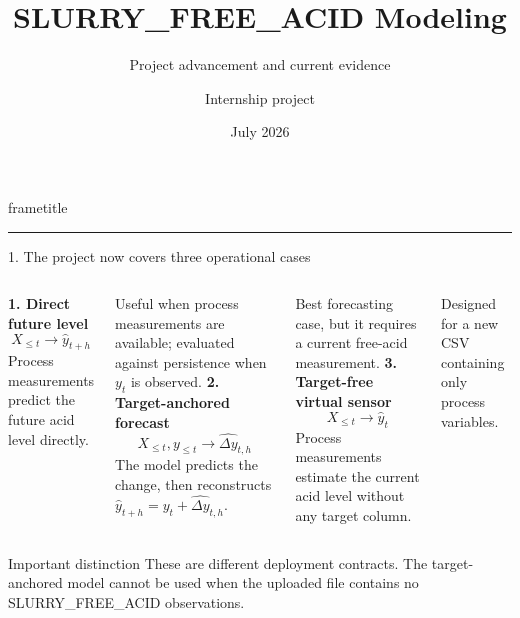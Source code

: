 \documentclass[10pt,aspectratio=169]{beamer}
\title{SLURRY\_FREE\_ACID Modeling}
\subtitle{Project advancement and current evidence}
\author{Internship project}
\date{July 2026}
\newcommand{\smallnote}[1]{{\scriptsize\color{Gray}#1}}
\begin{document}
\begin{frame}[plain]
  \begin{beamercolorbox}[wd=\paperwidth,ht=\paperheight,dp=0pt]{frametitle}
    \vspace{2.2cm}\hspace{1.3cm}
    \begin{minipage}{0.76\textwidth}
      {\color{white}\LARGE\bfseries\inserttitle\par}
      \vspace{0.3cm}
      {\color{white!85}\Large\insertsubtitle\par}
      \vspace{0.8cm}
      {\color{white!70}\insertauthor\hfill\insertdate}
    \end{minipage}
    \vfill
    \color{Gold}\rule{\paperwidth}{4pt}
  \end{beamercolorbox}
\end{frame}

\begin{frame}{1. The project now covers three operational cases}
  \begin{columns}[T,onlytextwidth]
      \textbf{1. Direct future level}
      \[X_{\leq t}\longrightarrow \hat y_{t+h}\]
      Process measurements predict the future acid level directly.
      \vspace{0.2cm}

      \smallnote{Useful when process measurements are available; evaluated against persistence when $y_t$ is observed.}
      \textbf{2. Target-anchored forecast}
      \[X_{\leq t},y_{\leq t}\longrightarrow \widehat{\Delta y}_{t,h}\]
      The model predicts the change, then reconstructs
      $\hat y_{t+h}=y_t+\widehat{\Delta y}_{t,h}$.
      \vspace{0.2cm}

      \smallnote{Best forecasting case, but it requires a current free-acid measurement.}
      \textbf{3. Target-free virtual sensor}
      \[X_{\leq t}\longrightarrow \hat y_t\]
      Process measurements estimate the current acid level without any target column.
      \vspace{0.2cm}

      \smallnote{Designed for a new CSV containing only process variables.}
  \end{columns}

  \vfill
  \begin{block}{Important distinction}
    These are different deployment contracts. The target-anchored model cannot be used when the uploaded file contains no SLURRY\_FREE\_ACID observations.
  \end{block}
\end{frame}
\end{document}
